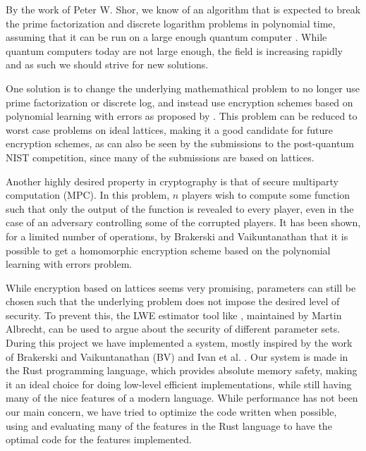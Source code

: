 \documentclass[../main.tex]{subfiles}
\begin{document}
By the work of Peter W. Shor, we know of an algorithm that is expected to break
the prime factorization and discrete logarithm problems in polynomial time, assuming that it can be run
on a large enough quantum computer \cite{Shor_1997}.
While quantum computers today are not large enough, the field is increasing rapidly and as such
we should strive for new solutions.

One solution is to change the underlying mathemathical problem to no longer use prime factorization or
discrete log, and instead use encryption schemes based on polynomial learning with errors as proposed by \cite{IdealLatAndRLWE}. This problem can be reduced to worst case problems on ideal lattices, making it a good candidate for future encryption schemes, as can also be seen by the submissions to the post-quantum NIST competition, since many of the submissions are based on lattices.

Another highly desired property in cryptography is that of secure multiparty computation (MPC).
In this problem, $n$ players wish to compute some function such that only the output of the function
is revealed to every player, even in the case of an adversary controlling some of the corrupted players.
It has been shown, for a limited number of operations, by Brakerski and Vaikuntanathan \cite{brakerski2011fully} that it is possible to get a homomorphic encryption scheme based on the polynomial learning with errors problem.

While encryption based on lattices seems very promising, parameters can still be chosen such that the
underlying problem does not impose the desired level of security.
To prevent this, the LWE estimator tool like \cite{cryptoeprint:2015:046}, maintained by Martin Albrecht, can be used to argue about the security of different parameter sets.
\\[5mm]
During this project we have implemented a system, mostly inspired by the work of Brakerski and Vaikuntanathan (BV) \cite{brakerski2011fully} and Ivan et al. \cite{damgaard2012multiparty}.
Our system is made in the Rust programming language, which provides absolute memory safety,
making it an ideal choice for doing low-level efficient implementations, while still having many of
the nice features of a modern language.
While performance has not been our main concern, we have tried to optimize the code written when possible, using and evaluating many of the features in the Rust language to have the optimal code for the features implemented.
\end{document}
